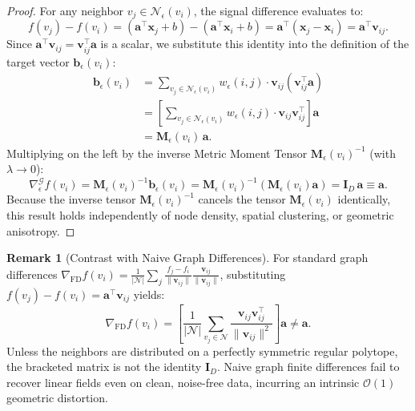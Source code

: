 \documentclass[11pt,a4paper]{article}
\theoremstyle{definition}
\newtheorem{remark}{Remark}
\begin{document}
\begin{proof}
For any neighbor $v_j \in \mathcal{N}_\epsilon(v_i)$, the signal difference evaluates to:
\begin{equation}
f(v_j) - f(v_i) = \left( \mathbf{a}^\top \mathbf{x}_j + b \right) - \left( \mathbf{a}^\top \mathbf{x}_i + b \right) = \mathbf{a}^\top (\mathbf{x}_j - \mathbf{x}_i) = \mathbf{a}^\top \mathbf{v}_{ij}.
\end{equation}
Since $\mathbf{a}^\top \mathbf{v}_{ij} = \mathbf{v}_{ij}^\top \mathbf{a}$ is a scalar, we substitute this identity into the definition of the target vector $\mathbf{b}_\epsilon(v_i)$:
\begin{align}
\mathbf{b}_\epsilon(v_i) &= \sum_{v_j \in \mathcal{N}_\epsilon(v_i)} w_\epsilon(i, j) \cdot \mathbf{v}_{ij} \left( \mathbf{v}_{ij}^\top \mathbf{a} \right) \nonumber \\
&= \left[ \sum_{v_j \in \mathcal{N}_\epsilon(v_i)} w_\epsilon(i, j) \cdot \mathbf{v}_{ij} \mathbf{v}_{ij}^\top \right] \mathbf{a} \nonumber \\
&= \mathbf{M}_\epsilon(v_i) \, \mathbf{a}.
\end{align}
Multiplying on the left by the inverse Metric Moment Tensor $\mathbf{M}_\epsilon(v_i)^{-1}$ (with $\lambda \to 0$):
\begin{equation}
\nabla_\epsilon^{\mathcal{G}} f(v_i) = \mathbf{M}_\epsilon(v_i)^{-1} \mathbf{b}_\epsilon(v_i) = \mathbf{M}_\epsilon(v_i)^{-1} \left( \mathbf{M}_\epsilon(v_i) \mathbf{a} \right) = \mathbf{I}_D \, \mathbf{a} \equiv \mathbf{a}.
\end{equation}
Because the inverse tensor $\mathbf{M}_\epsilon(v_i)^{-1}$ cancels the tensor $\mathbf{M}_\epsilon(v_i)$ identically, this result holds independently of node density, spatial clustering, or geometric anisotropy.
\end{proof}

\begin{remark}[Contrast with Naive Graph Differences]
For standard graph differences $\nabla_{\text{FD}} f(v_i) = \frac{1}{|\mathcal{N}|} \sum_{j} \frac{f_j - f_i}{\|\mathbf{v}_{ij}\|} \frac{\mathbf{v}_{ij}}{\|\mathbf{v}_{ij}\|}$, substituting $f(v_j) - f(v_i) = \mathbf{a}^\top \mathbf{v}_{ij}$ yields:
\begin{equation}
\nabla_{\text{FD}} f(v_i) = \left[ \frac{1}{|\mathcal{N}|} \sum_{v_j \in \mathcal{N}} \frac{\mathbf{v}_{ij} \mathbf{v}_{ij}^\top}{\|\mathbf{v}_{ij}\|^2} \right] \mathbf{a} \neq \mathbf{a}.
\end{equation}
Unless the neighbors are distributed on a perfectly symmetric regular polytope, the bracketed matrix is not the identity $\mathbf{I}_D$. Naive graph finite differences fail to recover linear fields even on clean, noise-free data, incurring an intrinsic $\mathcal{O}(1)$ geometric distortion.
\end{remark}
\end{document}
